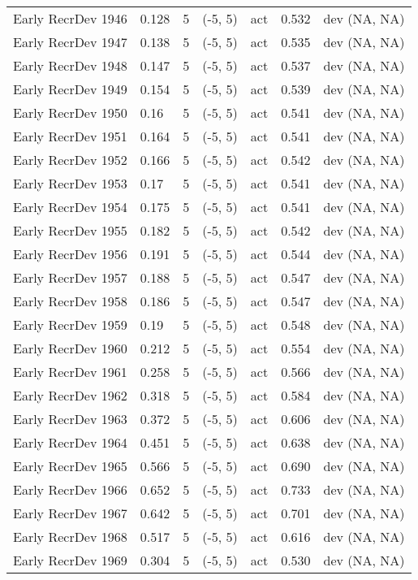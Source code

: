 \documentclass[11pt,
  english,
  letterpaper,
]{article}
\begin{document}
\begin{landscape}
\begin{longtable}[t]{>{\raggedright\arraybackslash}p{7.5cm}lllll>{\raggedright\arraybackslash}p{3.5cm}}
Early RecrDev 1946 & 0.128 & 5 & (-5, 5) & act & 0.532 & dev (NA, NA)\\
Early RecrDev 1947 & 0.138 & 5 & (-5, 5) & act & 0.535 & dev (NA, NA)\\
Early RecrDev 1948 & 0.147 & 5 & (-5, 5) & act & 0.537 & dev (NA, NA)\\
Early RecrDev 1949 & 0.154 & 5 & (-5, 5) & act & 0.539 & dev (NA, NA)\\
Early RecrDev 1950 & 0.16 & 5 & (-5, 5) & act & 0.541 & dev (NA, NA)\\
Early RecrDev 1951 & 0.164 & 5 & (-5, 5) & act & 0.541 & dev (NA, NA)\\
Early RecrDev 1952 & 0.166 & 5 & (-5, 5) & act & 0.542 & dev (NA, NA)\\
Early RecrDev 1953 & 0.17 & 5 & (-5, 5) & act & 0.541 & dev (NA, NA)\\
Early RecrDev 1954 & 0.175 & 5 & (-5, 5) & act & 0.541 & dev (NA, NA)\\
Early RecrDev 1955 & 0.182 & 5 & (-5, 5) & act & 0.542 & dev (NA, NA)\\
Early RecrDev 1956 & 0.191 & 5 & (-5, 5) & act & 0.544 & dev (NA, NA)\\
Early RecrDev 1957 & 0.188 & 5 & (-5, 5) & act & 0.547 & dev (NA, NA)\\
Early RecrDev 1958 & 0.186 & 5 & (-5, 5) & act & 0.547 & dev (NA, NA)\\
Early RecrDev 1959 & 0.19 & 5 & (-5, 5) & act & 0.548 & dev (NA, NA)\\
Early RecrDev 1960 & 0.212 & 5 & (-5, 5) & act & 0.554 & dev (NA, NA)\\
Early RecrDev 1961 & 0.258 & 5 & (-5, 5) & act & 0.566 & dev (NA, NA)\\
Early RecrDev 1962 & 0.318 & 5 & (-5, 5) & act & 0.584 & dev (NA, NA)\\
Early RecrDev 1963 & 0.372 & 5 & (-5, 5) & act & 0.606 & dev (NA, NA)\\
Early RecrDev 1964 & 0.451 & 5 & (-5, 5) & act & 0.638 & dev (NA, NA)\\
Early RecrDev 1965 & 0.566 & 5 & (-5, 5) & act & 0.690 & dev (NA, NA)\\
Early RecrDev 1966 & 0.652 & 5 & (-5, 5) & act & 0.733 & dev (NA, NA)\\
Early RecrDev 1967 & 0.642 & 5 & (-5, 5) & act & 0.701 & dev (NA, NA)\\
Early RecrDev 1968 & 0.517 & 5 & (-5, 5) & act & 0.616 & dev (NA, NA)\\
Early RecrDev 1969 & 0.304 & 5 & (-5, 5) & act & 0.530 & dev (NA, NA)\\

\end{longtable}
\end{landscape}
\end{document}
